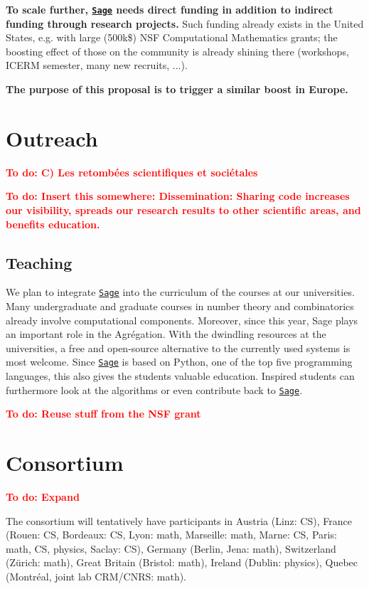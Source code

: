 \documentclass[a4,12pt]{amsart}
\newcommand{\sage}{\href{http://www.sagemath.org/}{\texttt{Sage}}\xspace}
\newcommand{\TODO}[2][To do: ]{{\textcolor{red}{\textbf{#1#2}}}}
\begin{document}
\textbf{To scale further, \sage needs direct funding in addition to
  indirect funding through research projects.} Such funding already
exists in the United States, e.g. with large (500k\$) NSF
Computational Mathematics grants; the boosting effect of those on the
community is already shining there (workshops, ICERM semester, many
new recruits, ...).

\medskip
\textbf{The purpose of this proposal is to trigger a similar boost in
  Europe.}

\section{Outreach}

\TODO{C) Les retombées scientifiques et sociétales}

\TODO{Insert this somewhere: Dissemination: Sharing code increases our
  visibility, spreads our research results to other scientific areas,
  and benefits education.}

\subsection{Teaching}

We plan to integrate \sage into the curriculum of the courses at our
universities. Many undergraduate and graduate courses in number theory
and combinatorics already involve computational components. Moreover,
since this year, Sage plays an important role in the Agrégation. With
the dwindling resources at the universities, a free and open-source
alternative to the currently used systems %
is most welcome. Since \sage is based on Python, one of the top five
programming languages, this also gives the students valuable
education.  Inspired students can furthermore look at the algorithms
or even contribute back to \sage.

\TODO{Reuse stuff from the NSF grant}

\section{Consortium}

\TODO{Expand}

The consortium will tentatively have participants in Austria (Linz:
CS), France (Rouen: CS, Bordeaux: CS, Lyon: math, Marseille: math,
Marne: CS, Paris: math, CS, physics, Saclay: CS), Germany (Berlin,
Jena: math), Switzerland (Zürich: math), Great Britain (Bristol:
math), Ireland (Dublin: physics), Quebec (Montréal, joint lab
CRM/CNRS: math).
\end{document}
